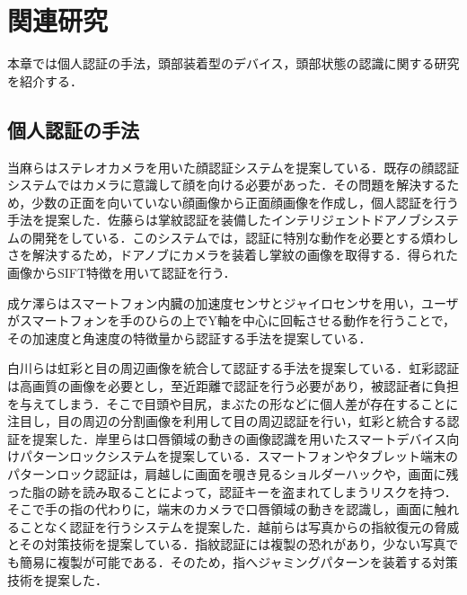 \chapter{関連研究}
\label{related}
本章では個人認証の手法，頭部装着型のデバイス，頭部状態の認識に関する研究を紹介する．
\section{個人認証の手法}
当麻ら\cite{face}はステレオカメラを用いた顔認証システムを提案している．既存の顔認証システムではカメラに意識して顔を向ける必要があった．その問題を解決するため，少数の正面を向いていない顔画像から正面顔画像を作成し，個人認証を行う手法を提案した．佐藤ら\cite{door}は掌紋認証を装備したインテリジェントドアノブシステムの開発をしている．このシステムでは，認証に特別な動作を必要とする煩わしさを解決するため，ドアノブにカメラを装着し掌紋の画像を取得する．得られた画像からSIFT特徴を用いて認証を行う．\par
成ケ澤ら\cite{acceleration}はスマートフォン内臓の加速度センサとジャイロセンサを用い，ユーザがスマートフォンを手のひらの上でY軸を中心に回転させる動作を行うことで，その加速度と角速度の特徴量から認証する手法を提案している．\par
白川ら\cite{iris_eye}は虹彩と目の周辺画像を統合して認証する手法を提案している．虹彩認証は高画質の画像を必要とし，至近距離で認証を行う必要があり，被認証者に負担を与えてしまう．そこで目頭や目尻，まぶたの形などに個人差が存在することに注目し，目の周辺の分割画像を利用して目の周辺認証を行い，虹彩と統合する認証を提案した．岸里ら\cite{mouth_pattern}は口唇領域の動きの画像認識を用いたスマートデバイス向けパターンロックシステムを提案している．スマートフォンやタブレット端末のパターンロック認証は，肩越しに画面を覗き見るショルダーハックや，画面に残った脂の跡を読み取ることによって，認証キーを盗まれてしまうリスクを持つ．そこで手の指の代わりに，端末のカメラで口唇領域の動きを認識し，画面に触れることなく認証を行うシステムを提案した．越前ら\cite{finger_print}は写真からの指紋復元の脅威とその対策技術を提案している．指紋認証には複製の恐れがあり，少ない写真でも簡易に複製が可能である．そのため，指へジャミングパターンを装着する対策技術を提案した．\par
